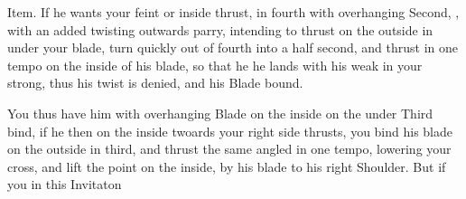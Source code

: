 \newpage


\newpage

Item. If he wants your feint or inside thrust, in fourth with
overhanging Second, , with an
added twisting outwards parry, intending to thrust on the outside in
under your blade, turn quickly out of fourth into a half second, and
thrust in one tempo on the inside of his blade, so that he he lands
with his weak in your strong, thus his twist is denied, and his Blade bound.

You thus have him with overhanging Blade on the inside on the under
Third bind, if he then on the inside twoards your right side thrusts,
you bind his blade on the outside in third, and thrust the same angled
in one tempo, lowering your cross, and lift the point on the inside,
by his blade to his right Shoulder. But if you in this Invitaton

